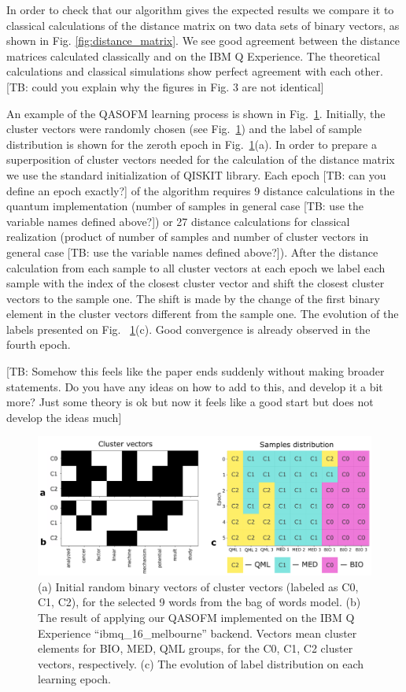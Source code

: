 \documentclass[pra,showkeys,twocolumn,showpacs]{revtex4-1}
\begin{document}
In order to check that our algorithm gives the expected results we compare it to classical calculations of the distance matrix on two data sets of binary vectors, as shown in Fig. \ref{fig:distance_matrix}.  We see good agreement between the distance matrices calculated classically and on the IBM Q Experience. The theoretical calculations and classical simulations show perfect agreement with each other. [TB: could you explain why the figures in Fig. 3 are not identical]

An example of the QASOFM learning process is shown in Fig.~\ref{convergence}. Initially, the cluster vectors were randomly chosen (see Fig.~\ref{convergence}) and the label of sample distribution is shown for the zeroth epoch in Fig.~\ref{convergence}(a). In order to prepare a superposition of cluster vectors needed for the calculation of the distance matrix we use the standard initialization of QISKIT library. Each epoch [TB: can you define an epoch exactly?] of the algorithm requires 9 distance calculations in the  quantum implementation (number of samples in general case [TB: use the variable names defined above?]) or 27 distance calculations for classical realization (product of number of samples and number of cluster vectors in general case [TB: use the variable names defined above?]). After the distance calculation from each sample to all cluster vectors at each epoch we label each sample with the index of the closest cluster vector and shift the closest cluster vectors to the sample one. The shift is made by the change of the first binary element in the cluster vectors different from the sample one. The evolution of the labels presented on Fig. ~\ref{convergence}(c).  Good convergence is already observed in the fourth epoch.



[TB: Somehow this feels like the paper ends suddenly without making broader statements.  Do you have any ideas on how to add to this, and develop it a bit more? Just some theory is ok but now it feels like a good start but does not develop the ideas much]

\begin{figure}[t]
\includegraphics[width=0.95\columnwidth]{convergence.png}
\caption{
    (a) Initial random binary vectors of cluster vectors (labeled as C0, C1, C2), for the selected 9 words from the bag of words model. (b) The result of applying our QASOFM implemented on the IBM Q Experience ``ibmq\_16\_melbourne'' backend. Vectors mean cluster elements for BIO, MED, QML groups, for the C0, C1, C2 cluster vectors, respectively. (c) The evolution of label distribution on each learning epoch.
} 
\label{convergence}
\end{figure}
\end{document}
